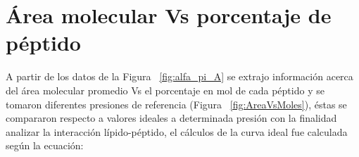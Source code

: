 {%
%
%
%    



%
%
\section{Área molecular Vs porcentaje de péptido}{\label{AvsMol}}

A partir de los datos de la Figura ~\ref{fig:alfa_pi_A} se extrajo información acerca del área molecular promedio Vs el porcentaje en mol de cada péptido y se tomaron diferentes presiones de referencia (Figura ~\ref{fig:AreaVsMoles}), éstas se compararon  respecto a valores ideales a determinada presión con la finalidad analizar la interacción lípido-péptido, el cálculos de la curva ideal fue calculada según la ecuación:
%

}
